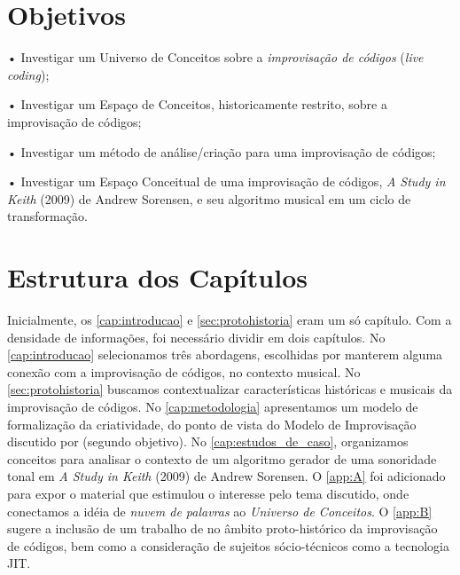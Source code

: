 \section*{Objetivos}\label{sec:objetivos}

• Investigar um Universo de Conceitos sobre a \emph{improvisação de códigos} (\emph{live coding});

• Investigar um Espaço de Conceitos, historicamente restrito, sobre a improvisação de códigos;

• Investigar um método de análise/criação para uma improvisação de códigos;

• Investigar um Espaço Conceitual de uma improvisação de códigos, \emph{A Study in Keith} (2009) de Andrew Sorensen, e seu algoritmo musical em um ciclo de transformação.

\section*{Estrutura dos Capítulos}

Inicialmente, os \autoref{cap:introducao} e \autoref{sec:protohistoria} eram um só capítulo. Com a densidade de informações, foi necessário dividir em dois capítulos. No \autoref{cap:introducao} selecionamos três abordagens, escolhidas por manterem alguma conexão com a improvisação de códigos, no contexto musical.  No \autoref{sec:protohistoria} buscamos contextualizar características históricas e musicais da improvisação de códigos. No \autoref{cap:metodologia} apresentamos um modelo de formalização da criatividade, do ponto de vista do Modelo de Improvisação discutido por  (segundo objetivo). No \autoref{cap:estudos_de_caso}, organizamos conceitos para analisar o contexto de um algoritmo gerador de uma sonoridade tonal em \emph{A Study in Keith} (2009) de Andrew Sorensen.  O \autoref{app:A} foi adicionado para expor o material que estimulou o interesse pelo tema discutido, onde conectamos a idéia de \emph{nuvem de palavras} ao \emph{Universo de Conceitos}. O \autoref{app:B} sugere a inclusão de um trabalho de  no âmbito proto-histórico da improvisação de códigos, bem como a consideração de sujeitos sócio-técnicos como a tecnologia JIT.